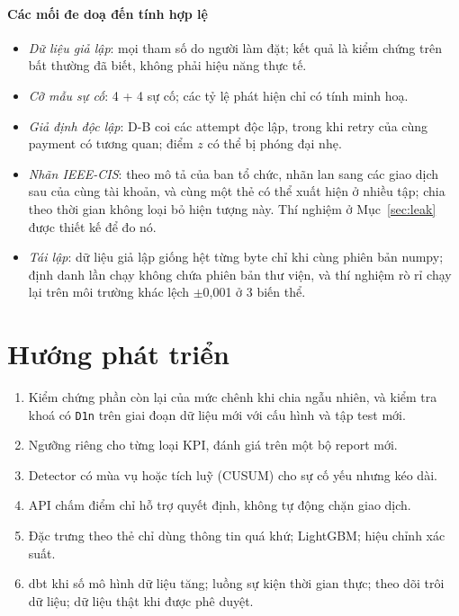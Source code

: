 \documentclass[11pt,a4paper]{article}
\theoremstyle{definition}
\theoremstyle{remark}
\newcommand{\code}[1]{\texttt{#1}}
\numberwithin{equation}{section}
\begin{document}
\paragraph{Các mối đe doạ đến tính hợp lệ}
\begin{itemize}
  \item \emph{Dữ liệu giả lập}: mọi tham số do người làm đặt; kết quả là kiểm chứng trên bất thường đã biết, không phải hiệu năng thực tế.
  \item \emph{Cỡ mẫu sự cố}: 4 + 4 sự cố; các tỷ lệ phát hiện chỉ có tính minh hoạ.
  \item \emph{Giả định độc lập}: D-B coi các attempt độc lập, trong khi retry của cùng payment có tương quan; điểm $z$ có thể bị phóng đại nhẹ.
  \item \emph{Nhãn IEEE-CIS}: theo mô tả của ban tổ chức, nhãn lan sang các giao dịch sau của cùng tài khoản, và cùng một thẻ có thể xuất hiện ở nhiều tập; chia theo thời gian không loại bỏ hiện tượng này. Thí nghiệm ở Mục~\ref{sec:leak} được thiết kế để đo nó.
  \item \emph{Tái lập}: dữ liệu giả lập giống hệt từng byte chỉ khi cùng phiên bản numpy; định danh lần chạy không chứa phiên bản thư viện, và thí nghiệm rò rỉ chạy lại trên môi trường khác lệch $\pm$0,001 ở 3 biến thể.
\end{itemize}

\section{Hướng phát triển}
\begin{enumerate}
  \item Kiểm chứng phần còn lại của mức chênh khi chia ngẫu nhiên, và kiểm tra khoá có \code{D1n} trên giai đoạn dữ liệu mới với cấu hình và tập test mới.
  \item Ngưỡng riêng cho từng loại KPI, đánh giá trên một bộ report mới.
  \item Detector có mùa vụ \cite{fpp} hoặc tích luỹ (CUSUM) cho sự cố yếu nhưng kéo dài.
  \item API chấm điểm chỉ hỗ trợ quyết định, không tự động chặn giao dịch.
  \item Đặc trưng theo thẻ chỉ dùng thông tin quá khứ; LightGBM; hiệu chỉnh xác suất.
  \item dbt khi số mô hình dữ liệu tăng; luồng sự kiện thời gian thực; theo dõi trôi dữ liệu; dữ liệu thật khi được phê duyệt.
\end{enumerate}
\end{document}
